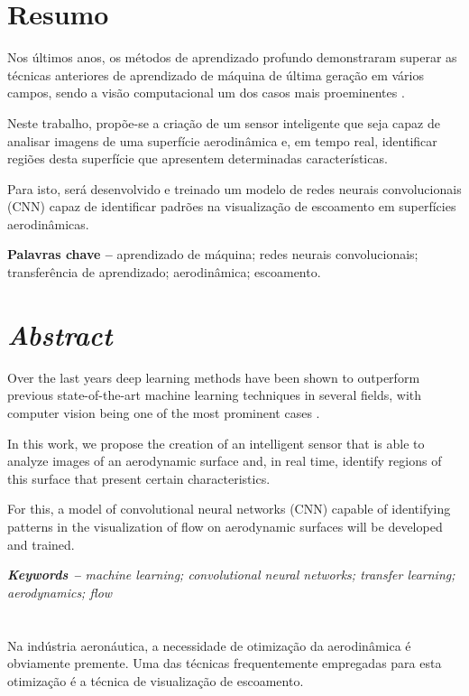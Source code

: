 \documentclass[12pt, a4paper]{article}
\begin{document}
\makeourtitle

\tableofcontents

\newpage
\section*{Resumo}
Nos últimos anos, os métodos de aprendizado profundo demonstraram superar as técnicas anteriores de aprendizado de máquina de última geração em vários campos, sendo a visão computacional um dos casos mais proeminentes \cite{PMID:29487619}.

Neste trabalho, propõe-se a criação de um sensor inteligente que seja capaz de analisar imagens de uma superfície aerodinâmica e, em tempo real, identificar regiões desta superfície que apresentem determinadas características.

Para isto, será desenvolvido e treinado um modelo de redes neurais convolucionais (CNN) capaz de identificar padrões na visualização de escoamento em superfícies aerodinâmicas.

\textbf{Palavras chave --} aprendizado de máquina; redes neurais convolucionais; transferência de aprendizado; aerodinâmica; escoamento.


\newpage
\section*{\emph{Abstract}}
\begin{em}
Over the last years deep learning methods have been shown to outperform previous state-of-the-art machine learning techniques in several fields, with computer vision being one of the most prominent cases \cite{PMID:29487619}.

In this work, we propose the creation of an intelligent sensor that is able to analyze images of an aerodynamic surface and, in real time, identify regions of this surface that present certain characteristics.

For this, a model of convolutional neural networks (CNN) capable of identifying patterns in the visualization of flow on aerodynamic surfaces will be developed and trained.
\end{em}

\textit{\textbf{Keywords --} machine learning; convolutional neural networks; transfer learning; aerodynamics; flow}


\newpage
\section{\sectionI}
\label{sec:intro}
Na indústria aeronáutica, a necessidade de otimização da aerodinâmica é obviamente premente. Uma das técnicas frequentemente empregadas para esta otimização é a técnica de visualização de escoamento.
\end{document}
